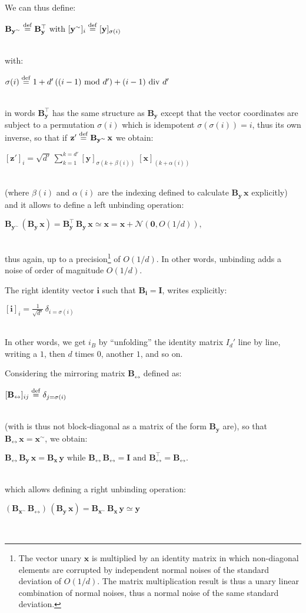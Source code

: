 \documentclass[sn-mathphys]{sn-jnl}
\newcommand{\defq}{\stackrel {\rm def}{=}}
\newcommand{\eqline}[1]{~\vspace{0.1cm}\\\centerline{$#1$}\vspace{0.1cm}\\}
\begin{document}
\begin{appendices}
We can thus define:
\eqline{\mathbf{B_{y^\sim}} \defq \mathbf{B_y^\top} \mbox{ with } [\mathbf{y^\sim}]_i \defq [\mathbf{y}]_{\sigma(i)}}
with:
\eqline{\sigma(i) \defq  1 + d' \, ((i-1) \mbox{ mod } d') + (i-1) \mbox{ div } d'}
in words $\mathbf{B_y^\top}$ has the same structure as $\mathbf{B_y}$ except that the vector coordinates are subject to a permutation $\sigma(i)$ which is idempotent $\sigma(\sigma(i)) = i$, thus its own inverse, so that if 
$\mathbf{z'} \defq \mathbf{B_{y^\sim}} \, \mathbf{x}$ we obtain:
\eqline{[\mathbf{z'}]_i = \sqrt{d'} \, \sum_{k = 1}^{k = d'} [\mathbf{y}]_{\sigma(k + \beta(i))} \; [\mathbf{x}]_{(k + \alpha(i))}} (where $\beta(i)$ and $\alpha(i)$ are the indexing defined to calculate $\mathbf{B_{y}} \, \mathbf{x}$ explicitly) and it allows to define a left unbinding operation:
\eqline{\mathbf{B_{y^\sim}} \, (\mathbf{B_y} \, \mathbf{x}) = \mathbf{B_y^\top} \, \mathbf{B_y} \, \mathbf{x} \simeq \mathbf{x}
  = \mathbf{x} + {\mathcal N}(\mathbf{0}, O(1/d)),}
thus again, up to a precision\footnote{The vector unary $\mathbf{x}$ is multiplied by an identity matrix in which non-diagonal elements are corrupted by independent normal noises of the standard deviation of $O(1/d)$. The matrix multiplication result is thus a unary linear combination of normal noises, thus a normal noise of the same standard deviation.} of $O(1/d)$. In other words,  unbinding adds a noise of order of magnitude $O(1/d)$.

The right identity vector $\mathbf{\mathbf{i}}$ such that $\mathbf{B_{\mathbf{i}}} = \mathbf{I}$, writes explicitly:
\eqline{[\mathbf{\mathbf{i}}]_i = \frac{1}{\sqrt{d'}} \, \delta_{i = \sigma(i)}}
In other words, we get $i_B$ by ``unfolding'' the identity matrix $I_d'$ line by line, writing a $1$, then $d$ times $0$, another $1$, and so on.

Considering the mirroring matrix $\mathbf{B_{\leftrightarrow}}$ defined as:
\eqline{[\mathbf{B_{\leftrightarrow}}]_{ij} \defq \delta_{j = \sigma(i)}}
(with is thus not block-diagonal as a matrix of the form $\mathbf{B_y}$ are), so that $\mathbf{B_{\leftrightarrow}} \, \mathbf{x} = \mathbf{x}^\sim$, we obtain:
\eqline{\mathbf{B_{\leftrightarrow}} \, \mathbf{B_y} \, \mathbf{x} = \mathbf{B_x} \, \mathbf{y}
\mbox{ while } \mathbf{B_{\leftrightarrow}} \,\mathbf{B_{\leftrightarrow}} = \mathbf{I} \mbox{ and } \mathbf{B_{\leftrightarrow}^\top} = \mathbf{B_{\leftrightarrow}}.}
which allows defining a right unbinding operation:
\eqline{(\mathbf{B_{x^\sim}} \, \mathbf{B_{\leftrightarrow}}) \, (\mathbf{B_y} \, \mathbf{x}) = \mathbf{B_{x^\sim}} \, \mathbf{B_x} \, \mathbf{y} \simeq \mathbf{y}}


\end{appendices}
\end{document}
